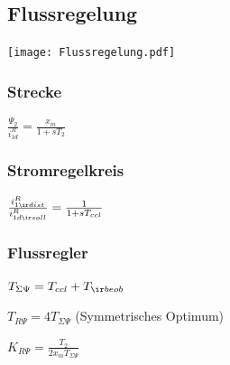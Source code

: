 \documentclass[german]{latex4ei_fs}
\begin{document}
\begin{sectionbox}
\subsection{Flussregelung}
\texttt{[image: Flussregelung.pdf]}

\subsubsection*{Strecke}

$\frac{\Psi_2}{i_{1d}^R} = \frac{x_m}{1 + s T_2}$

\subsubsection*{Stromregelkreis}

$\frac{i_{1 \ir dist}^R}{i_{1d \ir soll}^R} = \frac{1}{1 + s T_{ccl}}$

\subsubsection*{Flussregler}
$T_{\Sigma \Psi} = T_{ccl} + T_{\ir beob}$   

$T_{R \Psi} = 4 T_{\Sigma \Psi}$ (Symmetrisches Optimum)

$K_{R \Psi} = \frac{T_2}{2 x_m T_{\Sigma \Psi}}$
\end{sectionbox}
\end{document}
